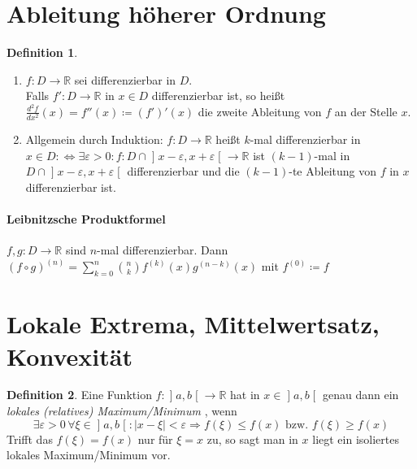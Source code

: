 \documentclass[ngerman,titlepage,twoside, parskip=half*]{scrreprt}
\newcommand*{\R}{\mathbb{R}}
\newcommand*{\perdef}{:\Leftrightarrow}
\theoremstyle{plain}
\theoremstyle{definition}
\newtheorem{definition}{Definition}
\theoremstyle{remark}
\newcommand*{\bsofint}[1]{\mathopen{]}#1\mathclose{[}} %
\begin{document}
\section{Ableitung höherer Ordnung}
\begin{definition}
  \begin{enumerate}[(1)]
    \item $f\colon D\rightarrow\R$ sei differenzierbar in $D$.\\
      Falls $f'\colon D\rightarrow\R$ in $x\in D$ differenzierbar ist, so
      heißt $\frac{d^2 f}{dx^2}(x)=f''(x)\coloneqq(f')'(x)$ die zweite 
      Ableitung von $f$ an der Stelle $x$.
    \item Allgemein durch Induktion: $f\colon D\rightarrow\R$ heißt $k$-mal
      differenzierbar in $x\in D\perdef \exists \varepsilon>0
      \colon f\colon D\cap \bsofint{x-\varepsilon,x+\varepsilon}\rightarrow\R$ ist $(k-1)$-mal
      in $D\cap\bsofint{x-\varepsilon,x+\varepsilon}$ differenzierbar und die
      $(k-1)$-te Ableitung von $f$ in $x$ differenzierbar ist.
  \end{enumerate}
\end{definition}

\paragraph{Leibnitzsche Produktformel}
$f,g\colon D\rightarrow\R$ sind $n$-mal differenzierbar. Dann $(f\circ g)^{(n)}
=\sum_{k=0}^n \binom{n}{k}f^{(k)}(x)g^{(n-k)}(x)$ mit $f^{(0)}\coloneqq f$

\section{Lokale Extrema, Mittelwertsatz, Konvexität}
\begin{definition}
  Eine Funktion $f\colon\bsofint{a,b}\rightarrow\R$ hat in $x\in \bsofint{a,b}$ genau dann
  ein \emph{lokales (relatives) Maximum/Minimum
  },
  wenn
  \[\exists \varepsilon>0\,\forall\xi\in \bsofint{a,b}\colon|x-\xi|<\varepsilon
  \Rightarrow f(\xi)\leq f(x) \text{ bzw. } f(\xi)\geq f(x)\]
  Trifft das $f(\xi)=f(x)$ nur für $\xi=x$ zu, so sagt man in $x$ liegt
  ein isoliertes lokales Maximum/Minimum vor.
\end{definition}
\end{document}
